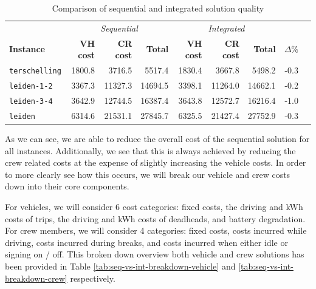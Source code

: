 \documentclass[]{article}
\begin{document}
\begin{table}[h]
  \centering
  \begin{tabular}{lrrrrrrrr}
    \toprule
       & \multicolumn{3}{c}{\textit{Sequential}} & \multicolumn{3}{c}{\textit{Integrated}} & \\
       \textbf{Instance} & \textbf{VH cost} & \textbf{CR cost} & \textbf{Total} & \textbf{VH cost} & \textbf{CR cost} & \textbf{Total} & $\Delta\%$ \\
       \cmidrule(lr){1-1} \cmidrule(lr){2-4} \cmidrule(lr){5-7} \cmidrule(lr){8-8}
        \texttt{terschelling}   & 1800.8 & 3716.5   & 5517.4  & 1830.4 & 3667.8   & 5498.2  & -0.3 \\
        \texttt{leiden-1-2}     & 3367.3 & 11327.3  & 14694.5 & 3398.1 & 11264.0  & 14662.1 & -0.2 \\
        \texttt{leiden-3-4}     & 3642.9 & 12744.5  & 16387.4 & 3643.8 & 12572.7  & 16216.4 & -1.0 \\
        \texttt{leiden}         & 6314.6 & 21531.1  & 27845.7 & 6325.5 & 21427.4  & 27752.9 & -0.3 \\
        \bottomrule
  \end{tabular}
  \caption{Comparison of sequential and integrated solution quality}
  \label{tab:seq-vs-int}
\end{table}

As we can see, we are able to reduce the overall cost of the sequential solution for all instances. Additionally, we see that this is always achieved by reducing the crew related costs at the expense of slightly increasing the vehicle costs. In order to more clearly see how this occurs, we will break our vehicle and crew costs down into their core components. 

For vehicles, we will consider 6 cost categories: fixed costs, the driving and kWh costs of trips, the driving and kWh costs of deadheads, and battery degradation. For crew members, we will consider 4 categories: fixed costs, costs incurred while driving, costs incurred during breaks, and costs incurred when either idle or signing on / off. This broken down overview both vehicle and crew solutions has been provided in Table \ref{tab:seq-vs-int-breakdown-vehicle} and \ref{tab:seq-vs-int-breakdown-crew} respectively.
\end{document}
